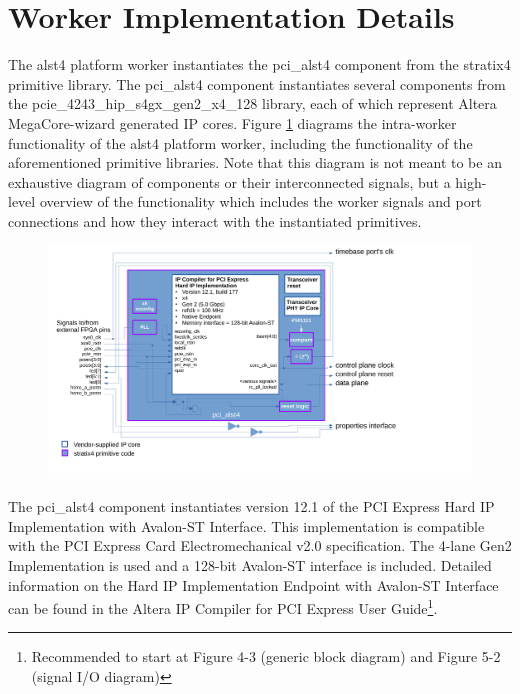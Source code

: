 \documentclass{article}
\begin{document}
\section*{Worker Implementation Details}
\begin{flushleft}
	The alst4 platform worker instantiates the pci\_alst4 component from the stratix4 primitive library. The pci\_alst4 component instantiates several components from the pcie\_4243\_hip\_s4gx\_gen2\_x4\_128 library, each of which represent Altera MegaCore-wizard generated IP cores. Figure \ref{fig:blockdiagram} diagrams the intra-worker functionality of the alst4 platform worker, including the functionality of the aforementioned primitive libraries. Note that this diagram is not meant to be an exhaustive diagram of components or their interconnected signals, but a high-level overview of the functionality which includes the worker signals and port connections and how they interact with the instantiated primitives.

	\begin{figure}[h]
		\centering\captionsetup{type=figure}\includegraphics[scale=0.5]{alst4_platform_worker_block_diagram}
		\label{fig:blockdiagram}
	\end{figure}
	The pci\_alst4 component instantiates version 12.1 of the PCI Express Hard IP Implementation with Avalon-ST Interface. This implementation is compatible with the PCI Express Card Electromechanical v2.0 specification. The 4-lane Gen2 Implementation is used and a 128-bit Avalon-ST interface is included. Detailed information on the Hard IP Implementation Endpoint with Avalon-ST Interface can be found in the Altera IP Compiler for PCI Express User Guide\footnote{Recommended to start at Figure 4-3 (generic block diagram) and Figure 5-2 (signal I/O diagram)}.

\end{flushleft}
\end{document}
